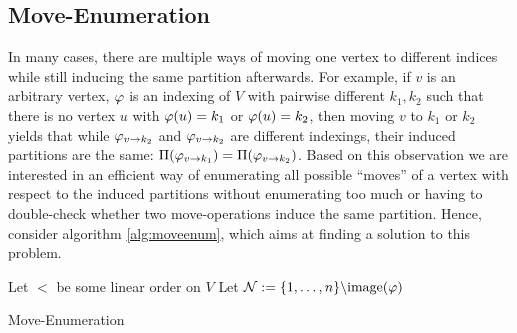 \subsection{Move-Enumeration}

In many cases, there are multiple ways of moving one vertex to different indices while still inducing the same partition afterwards. For example, if $v$ is an arbitrary vertex, $\varphi$ is an indexing of $V$ with pairwise different $k_1,k_2$ such that there is no vertex $u$ with $\varphi(u) = k_1$ or $\varphi(u) = k_2$, then moving $v$ to $k_1$ or $k_2$ yields that while $\varphi_{v\rightarrow k_2}$ and $\varphi_{v\rightarrow k_2}$ are different indexings, their induced partitions are the same: $\Pi(\varphi_{v\rightarrow k_1}) = \Pi(\varphi_{v\rightarrow k_2})$. Based on this observation we are interested in an efficient way of enumerating all possible ``moves'' of a vertex with respect to the induced partitions without enumerating too much or having to double-check whether two move-operations induce the same partition. Hence, consider algorithm \ref{alg:moveenum}, which aims at finding a solution to this problem.

\begin{algorithm}[H]
    \SetAlgoLined
    \DontPrintSemicolon
    Let $<$ be some linear order on $V$ \label{alg:moveenum:l1} \;
    Let $\mathcal{N} := \{1,\dots,n\}\backslash \mathrm{image}(\varphi)$  \label{alg:moveenum:l2} \;
    \caption{Move-Enumeration} \label{alg:moveenum}
\end{algorithm}


